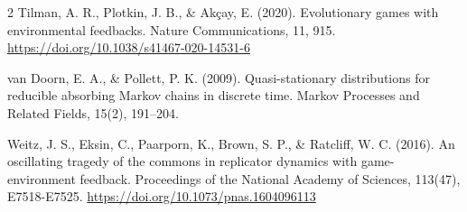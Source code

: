 \documentclass[10pt]{article}
\begin{document}
\begin{multicols}{2}
Tilman, A. R., Plotkin, J. B., \& Akçay, E. (2020). Evolutionary games
with environmental feedbacks. Nature Communications, 11, 915.
\url{https://doi.org/10.1038/s41467-020-14531-6}

van Doorn, E. A., \& Pollett, P. K. (2009). Quasi-stationary distributions for reducible absorbing Markov chains in discrete time. Markov Processes and Related Fields, 15(2), 191--204.

Weitz, J. S., Eksin, C., Paarporn, K., Brown, S. P., \& Ratcliff, W. C.
(2016). An oscillating tragedy of the commons in replicator dynamics
with game-environment feedback. Proceedings of the National Academy of
Sciences, 113(47), E7518-E7525. \url{https://doi.org/10.1073/pnas.1604096113}
\end{multicols}\endgroup
\end{document}
